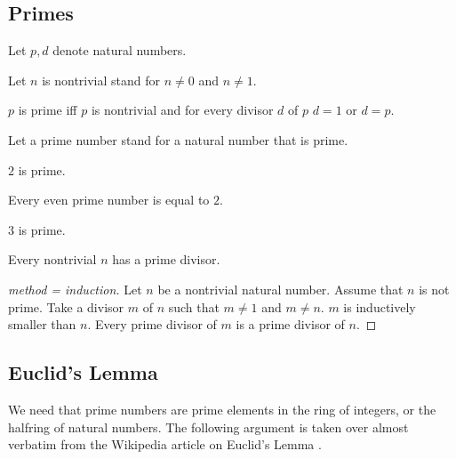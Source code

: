 \documentclass[english,11pt]{article}
\begin{document}
\subsection{Primes}

\begin{forthel}

Let $p,d$ denote natural numbers.

Let $n$ is nontrivial stand for $n \neq 0$ and $n \neq 1$.

\begin{definition}
$p$ is prime iff $p$ is nontrivial and
for every divisor $d$ of $p$ $d = 1$ or $d = p$.
\end{definition}
Let a prime number stand for a natural number that is prime.

\begin{lemma} $2$ is prime.
\end{lemma}

\begin{lemma}
Every even prime number is equal to $2$.
\end{lemma}

\begin{lemma} $3$ is prime.
\end{lemma}

\begin{lemma}
Every nontrivial $n$ has a prime divisor.
\end{lemma}
\begin{proof}[method = induction]
Let $n$ be a nontrivial natural number.
Assume that $n$ is not prime.
Take a divisor $m$ of $n$ such that $m \neq 1$ and $m \neq n$.
$m$ is inductively smaller than $n$.
Every prime divisor of $m$ is a prime divisor of $n$.
\end{proof}
\end{forthel}

\subsection{Euclid's Lemma}

We need that prime numbers are prime 
elements in the ring of integers, or the halfring of natural numbers.
The following argument is taken over almost verbatim from 
the Wikipedia article on Euclid's Lemma
\cite{Wikipedia_EuclidsLemma}.
\end{document}
